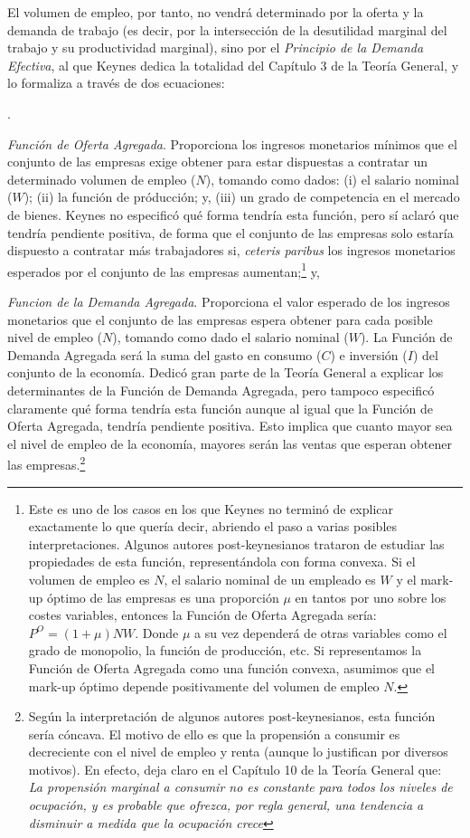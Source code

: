 \documentclass[10pt,a4paper]{article}
\newcounter{numitem}
\newenvironment{lnum}
      {\begin{list}{\arabic{numitem}.}{%
          \usecounter{numitem}%
          \setlength{\leftmargin}{1cm}%
          \setlength{\parskip}{3pt}%
          \setlength{\itemsep}{0pt}%
          \setlength{\parsep}{0pt}%
      }}
      {\end{list}}
\begin{document}
El volumen de empleo, por tanto, no vendrá determinado por la oferta y la demanda de trabajo (es decir, por la intersección de la desutilidad marginal del trabajo y su productividad marginal), sino por el \textit{Principio de la Demanda Efectiva}, al que Keynes dedica la totalidad del Capítulo 3 de la Teoría General, y lo formaliza a través de dos ecuaciones:
\begin{lnum}
    \item \textit{Función de Oferta Agregada}. Proporciona los ingresos monetarios mínimos que el conjunto de las empresas exige obtener para estar dispuestas a contratar un determinado volumen de empleo ($N$), tomando como dados: (i) el salario nominal ($W$); (ii) la función de próducción; y, (iii) un grado de competencia en el mercado de bienes. Keynes no especificó qué forma tendría esta función, pero sí aclaró que tendría pendiente positiva, de forma que el conjunto de las empresas solo estaría dispuesto a contratar más trabajadores si, \textit{ceteris paribus} los ingresos monetarios esperados por el conjunto de las empresas aumentan;\footnote{%
        Este es uno de los casos en los que Keynes no terminó de explicar exactamente lo que quería decir, abriendo el paso a varias posibles interpretaciones. Algunos autores post-keynesianos trataron de estudiar las propiedades de esta función, representándola con forma convexa. Si el volumen de empleo es $N$, el salario nominal de un empleado es $W$ y el mark-up óptimo de las empresas es una proporción $\mu$ en tantos por uno sobre los costes variables, entonces la Función de Oferta Agregada sería: $P^O=(1+\mu)NW$. Donde $\mu$ a su vez dependerá de otras variables como el grado de monopolio, la función de producción, etc. Si representamos la Función de Oferta Agregada como una función convexa, asumimos que el mark-up óptimo depende positivamente del volumen de empleo $N$.
    }  y,
    \item \textit{Funcion de la Demanda Agregada}. Proporciona el valor esperado de los ingresos monetarios que el conjunto de las empresas espera obtener para cada posible nivel de empleo ($N$), tomando como dado el salario nominal ($W$). La Función de Demanda Agregada será la suma del gasto en consumo ($C$) e inversión ($I$) del conjunto de la economía. Dedicó gran parte de la Teoría General a explicar los determinantes de la Función de Demanda Agregada, pero tampoco especificó claramente qué forma tendría esta función aunque al igual que la Función de Oferta Agregada, tendría pendiente positiva. Esto implica que cuanto mayor sea el nivel de empleo de la economía, mayores serán las ventas que esperan obtener las empresas.\footnote{%
        Según la interpretación de algunos autores post-keynesianos, esta función sería cóncava. El motivo de ello es que la propensión a consumir es decreciente con el nivel de empleo y renta (aunque lo justifican por diversos motivos). En efecto, deja claro en el Capítulo 10 de la Teoría General que:\\\textit{La propensión marginal a consumir no es constante para todos los niveles de ocupación, y es probable que ofrezca, por regla general, una tendencia a disminuir a medida que la ocupación crece}
    } 
\end{lnum}
\end{document}
